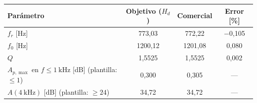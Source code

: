 \begin{tabular}{@{}lccc@{}}
\toprule
Parámetro & Objetivo ($H_d$) & Comercial & Error [\%] \\
\midrule
$f_r$ [Hz] & 773{,}03 & 772{,}22 & $-$0{,}105 \\
$f_0$ [Hz] & 1200{,}12 & 1201{,}08 & 0{,}080 \\
$Q$ & 1{,}5525 & 1{,}5525 & 0{,}002 \\
\midrule
$A_{p,\max}$ en $f \le \qty{1}{\kilo\hertz}$ [dB] (plantilla: $\le 1$) & 0{,}300 & 0{,}305 & --- \\
$A(\qty{4}{\kilo\hertz})$ [dB] (plantilla: $\ge 24$) & 34{,}72 & 34{,}72 & --- \\
\bottomrule
\end{tabular}